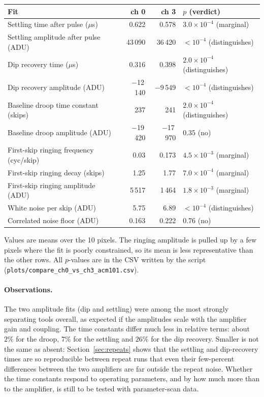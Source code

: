 \documentclass[11pt]{article}
\newcommand{\code}[1]{\texttt{#1}}
\begin{document}
\begin{center}
\begin{tabular}{l r r l}
\toprule
Fit & ch 0 & ch 3 & $p$ (verdict) \\
\midrule
Settling time after pulse ($\mu$s) & 0.622 & 0.578 & $3.0\times10^{-4}$ (marginal) \\
Settling amplitude after pulse (ADU) & 43\,090 & 36\,420 & $<10^{-4}$ (distinguishes) \\
Dip recovery time ($\mu$s) & 0.316 & 0.398 & $2.0\times10^{-4}$ (distinguishes) \\
Dip recovery amplitude (ADU) & $-$12\,140 & $-$9\,549 & $<10^{-4}$ (distinguishes) \\
Baseline droop time constant (skips) & 237 & 241 & $2.0\times10^{-4}$ (distinguishes) \\
Baseline droop amplitude (ADU) & $-$19\,420 & $-$17\,970 & 0.35 (no) \\
First-skip ringing frequency (cyc/skip) & 0.03 & 0.173 & $4.5\times10^{-3}$ (marginal) \\
First-skip ringing decay (skips) & 1.25 & 1.77 & $7.0\times10^{-4}$ (marginal) \\
First-skip ringing amplitude (ADU) & 5\,517 & 1\,464 & $1.8\times10^{-3}$ (marginal) \\
White noise per skip (ADU) & 5.75 & 6.89 & $<10^{-4}$ (distinguishes) \\
Correlated noise floor (ADU) & 0.163 & 0.222 & 0.76 (no) \\
\bottomrule
\end{tabular}
\end{center}

\noindent Values are means over the 10 pixels. The ringing amplitude is pulled up by a few pixels where the
fit is poorly constrained, so its mean is less representative than the other rows. All $p$-values are in the
CSV written by the script (\code{plots/compare\_ch0\_vs\_ch3\_acm101.csv}).

\paragraph{Observations.} The two amplitude fits (dip and settling) were among the most strongly separating tools
overall, as expected if the amplitudes scale with the amplifier gain and coupling. The time constants differ much less in
relative terms: about $2\%$ for the droop, $7\%$ for the settling and $26\%$ for the dip recovery. Smaller is not the same
as absent: Section~\ref{sec:repeats} shows that the settling and dip-recovery times are so reproducible between repeat
runs that even their few-percent differences between the two amplifiers are far outside the repeat noise. Whether the time
constants respond to operating parameters, and by how much more than to the amplifier, is still to be tested with
parameter-scan data.
\end{document}
